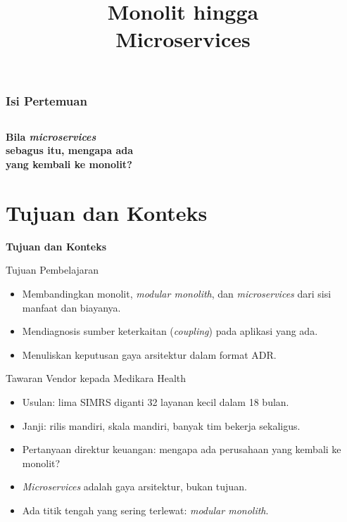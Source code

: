 \documentclass[aspectratio=169, table, 12pt]{beamer}
\title{\Huge Monolit hingga\\ \vspace{10pt} Microservices}
\begin{document}
\frame{\titlepage}

\begin{frame}
  \frametitle{Isi Pertemuan}
  \vspace{14pt}
  \begin{columns}[t]
    {\small\tableofcontents[sections={1-4}]}

    {\small\tableofcontents[sections={5-8}]}
  \end{columns}
\end{frame}

\begin{frame}{\hfill}
  \centering
  \Huge{\textbf{Bila \textit{microservices}\\sebagus itu, mengapa ada\\yang kembali ke monolit?}}
\end{frame}

\section{Tujuan dan Konteks}

\begin{frame}{\hfill}
  \centering
  \Huge{\textbf{Tujuan dan Konteks}}
\end{frame}

\begin{frame}{{\Large Tujuan Pembelajaran}}
  \vspace{10pt}
  \begin{itemize}
    \item Membandingkan monolit, \textit{modular monolith}, dan \textit{microservices} dari sisi
          manfaat dan biayanya.
    \item Mendiagnosis sumber keterkaitan (\textit{coupling}) pada aplikasi yang ada.
    \item Menuliskan keputusan gaya arsitektur dalam format ADR.
  \end{itemize}
\end{frame}

\begin{frame}{{\Large Tawaran Vendor kepada Medikara Health}}
  \vspace{10pt}
  \begin{itemize}
    \item Usulan: lima SIMRS diganti 32 layanan kecil dalam 18 bulan.
    \item Janji: rilis mandiri, skala mandiri, banyak tim bekerja sekaligus.
    \item Pertanyaan direktur keuangan: mengapa ada perusahaan yang kembali ke monolit?
    \item \textit{Microservices} adalah gaya arsitektur, bukan tujuan.
    \item Ada titik tengah yang sering terlewat: \textit{modular monolith}.
  \end{itemize}
\end{frame}
\end{document}

